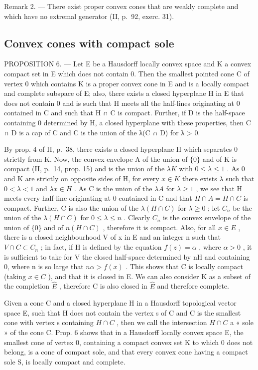 Remark 2. --- There exist proper convex cones that are weakly complete and which have no extremal generator (II, p.~92, exerc. 31).

\subsection{Convex cones with compact sole}

PROPOSITION 6. --- Let E be a Hausdorff locally convex space and K a convex compact set in E which does not contain 0. Then the smallest pointed cone C of vertex 0 which contains K is a proper convex cone in E and is a locally compact and complete subspace of E; also, there exists a closed hyperplane H in E that does not contain 0 and is such that H meets all the half-lines originating at 0 contained in C and such that H ∩ C is compact. Further, if D is the half-space containing 0 determined by H, a closed hyperplane with these properties, then C ∩ D is a cap of C and C is the union of the λ(C ∩ D) for λ \textgreater{} 0.

By prop. 4 of II, p.~38, there exists a closed hyperplane H which separates 0 strictly from K. Now, the convex envelope A of the union of \(\{0\}\) and of K is compact (II, p.~14, prop. 15) and is the union of the \(\lambda K\) with \(0 \leqslant \lambda \leqslant 1\) . As 0 and K are strictly on opposite sides of H, for every \(x \in K\) there exists \(\lambda\) such that \(0 < \lambda < 1\) and \(\lambda x \in H\) . As C is the union of the \(\lambda A\) for \(\lambda \geqslant 1\) , we see that H meets every half-line originating at 0 contained in C and that \(H \cap A = H \cap C\) is compact. Further, C is also the union of the \(\lambda(H \cap C)\) for \(\lambda \geqslant 0\) ; let \(C_n\) be the union of the \(\lambda(H \cap C)\) for \(0 \leqslant \lambda \leqslant n\) . Clearly \(C_n\) is the convex envelope of the union of \(\{0\}\) and of \(n(H \cap C)\) , therefore it is compact. Also, for all \(x \in E\) , there is a closed neighbourhood V of x in E and an integer n such that \(V \cap C \subset C_n\) ; in fact, if H is defined by the equation \(f(z) = \alpha\) , where \(\alpha > 0\) , it is sufficient to take for V the closed half-space determined by nH and containing 0, where n is so large that \(n\alpha > f(x)\) . This shows that C is locally compact (taking \(x \in C\) ), and that it is closed in E. We can also consider K as a subset of the completion \(\hat{E}\) , therefore C is also closed in \(\hat{E}\) and therefore complete.

Given a cone C and a closed hyperplane H in a Hausdorff topological vector space E, such that H does not contain the vertex s of C and C is the smallest cone with vertex s containing \(H \cap C\) , then we call the intersection \(H \cap C\) a « sole » of the cone C. Prop. 6 shows that in a Hausdorff locally convex space E, the smallest cone of vertex 0, containing a compact convex set K to which 0 does not belong, is a cone of compact sole, and that every convex cone having a compact sole S, is locally compact and complete.

